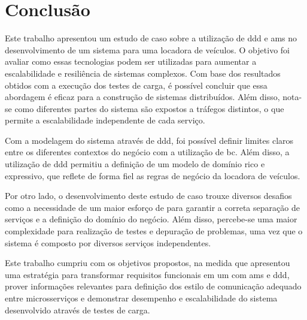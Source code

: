 \chapter{Conclusão}
\label{cap:conclusão}

Este trabalho apresentou um estudo de caso sobre a utilização de \acrfull{ddd} e \acrfull{ams} no desenvolvimento de um sistema para uma locadora de veículos. O objetivo foi avaliar como essas tecnologias podem ser utilizadas para aumentar a escalabilidade e resiliência de sistemas complexos. Com base dos resultados obtidos com a execução dos testes de carga, é possível concluir que essa abordagem é eficaz para a construção de sistemas distribuídos. Além disso, nota-se como diferentes partes do sistema são expostos a tráfegos distintos, o que permite a escalabilidade independente de cada serviço.

Com a modelagem do sistema através de \acrshort{ddd}, foi possível definir limites claros entre os diferentes contextos do negócio com a utilização de \acrfull{bc}. Além disso, a utilização de \acrshort{ddd} permitiu a definição de um modelo de domínio rico e expressivo, que reflete de forma fiel as regras de negócio da locadora de veículos.

Por otro lado, o desenvolvimento deste estudo de caso trouxe diversos desafios como a necessidade de um maior esforço de  para garantir a correta separação de serviços e a definição do domínio do negócio. Além disso, percebe-se uma maior complexidade para realização de testes e depuração de problemas, uma vez que o sistema é composto por diversos serviços independentes.

Este trabalho cumpriu com os objetivos propostos, na medida que apresentou uma estratégia para transformar requisitos funcionais em um  com \acrshort{ams} e \acrshort{ddd}, prover informações relevantes para definição dos estilo de comunicação adequado entre microsserviços e demonstrar desempenho e escalabilidade do sistema desenvolvido através de testes de carga.
